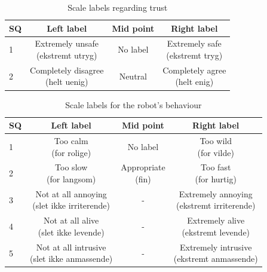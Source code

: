 \noindent
%
%
\begin{table}[H]
	\centering
\caption{Scale labels regarding trust}
	\label{tab:TrustScale} 
	\begin{tabular}{l|c|c|c}
		SQ  & Left label & Mid point & Right label \\\hline
		1   & \makecell{Extremely unsafe\\ (ekstremt utryg)} & No label & \makecell{Extremely safe \\(ekstremt tryg)}          \\\hline
		2   & \makecell{Completely disagree \\(helt uenig)} & Neutral &\makecell{Completely agree \\(helt enig)} 
	\end{tabular}        
\end{table}
\noindent
%
%
\begin{table}[H]
	\centering
\caption{Scale labels for the robot's behaviour}
	\label{tab:BehaviorScale} 
	\begin{tabular}{l|c|c|c}
		SQ     & Left label & Mid point & Right label \\\hline
		1   & \makecell{Too calm \\(for rolige)} & No label & \makecell{Too wild \\(for vilde)}           \\\hline
		2   & \makecell{Too slow \\(for langsom)} & \makecell{Appropriate \\(fin)} & \makecell{Too fast \\(for hurtig)}   \\\hline
		3   & \makecell{Not at all annoying \\(slet ikke irriterende)} & - & \makecell{Extremely annoying \\(ekstremt irriterende)}          \\\hline
	 	4   & \makecell{Not at all alive \\(slet ikke levende)} & - & \makecell{Extremely alive \\(ekstremt levende)}         \\\hline
		5   & \makecell{Not at all intrusive \\(slet ikke anmassende)} & - & \makecell{Extremely intrusive \\(ekstremt anmassende)}             
	\end{tabular}
\end{table}
\noindent
%
%
